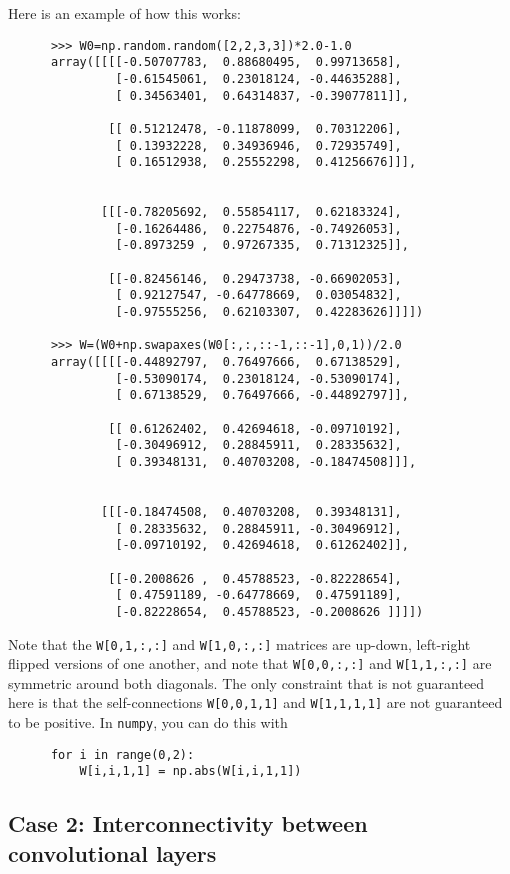 \documentclass[11pt,letterpaper]{article}
\theoremstyle{definition}
\begin{document}
\newpage
Here is an example of how this works:
\begin{verbatim}
      >>> W0=np.random.random([2,2,3,3])*2.0-1.0
      array([[[[-0.50707783,  0.88680495,  0.99713658],
               [-0.61545061,  0.23018124, -0.44635288],
               [ 0.34563401,  0.64314837, -0.39077811]],

              [[ 0.51212478, -0.11878099,  0.70312206],
               [ 0.13932228,  0.34936946,  0.72935749],
               [ 0.16512938,  0.25552298,  0.41256676]]],


             [[[-0.78205692,  0.55854117,  0.62183324],
               [-0.16264486,  0.22754876, -0.74926053],
               [-0.8973259 ,  0.97267335,  0.71312325]],

              [[-0.82456146,  0.29473738, -0.66902053],
               [ 0.92127547, -0.64778669,  0.03054832],
               [-0.97555256,  0.62103307,  0.42283626]]]])

      >>> W=(W0+np.swapaxes(W0[:,:,::-1,::-1],0,1))/2.0
      array([[[[-0.44892797,  0.76497666,  0.67138529],
               [-0.53090174,  0.23018124, -0.53090174],
               [ 0.67138529,  0.76497666, -0.44892797]],

              [[ 0.61262402,  0.42694618, -0.09710192],
               [-0.30496912,  0.28845911,  0.28335632],
               [ 0.39348131,  0.40703208, -0.18474508]]],


             [[[-0.18474508,  0.40703208,  0.39348131],
               [ 0.28335632,  0.28845911, -0.30496912],
               [-0.09710192,  0.42694618,  0.61262402]],

              [[-0.2008626 ,  0.45788523, -0.82228654],
               [ 0.47591189, -0.64778669,  0.47591189],
               [-0.82228654,  0.45788523, -0.2008626 ]]]])
\end{verbatim}
Note that the {\tt W[0,1,:,:]} and {\tt W[1,0,:,:]} matrices are up-down, 
left-right flipped versions of one another, and note that {\tt W[0,0,:,:]} and 
{\tt W[1,1,:,:]} are symmetric around both diagonals.  The only constraint 
that is not guaranteed here is that the self-connections {\tt W[0,0,1,1]} and 
{\tt W[1,1,1,1]} are not guaranteed to be positive. In {\tt numpy}, you can
do this with
\begin{verbatim}
      for i in range(0,2):
          W[i,i,1,1] = np.abs(W[i,i,1,1])
      \end{verbatim}



\subsection{Case 2: Interconnectivity between convolutional layers}
\end{document}
